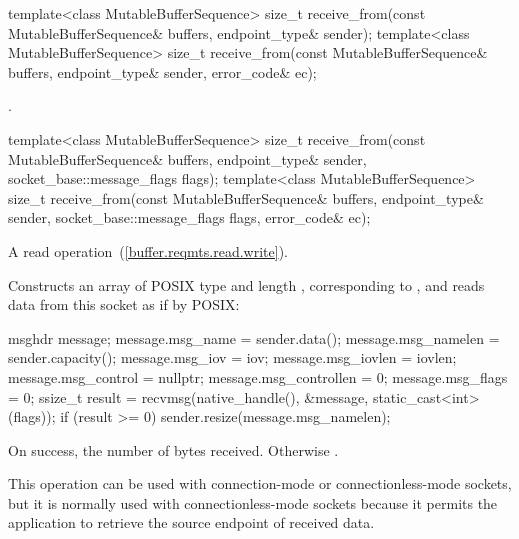 \begin{itemdecl}
template<class MutableBufferSequence>
  size_t receive_from(const MutableBufferSequence& buffers,
                      endpoint_type& sender);
template<class MutableBufferSequence>
  size_t receive_from(const MutableBufferSequence& buffers,
                      endpoint_type& sender, error_code& ec);
\end{itemdecl}

\begin{itemdescr}
\pnum
\returns {}.
\end{itemdescr}

\begin{itemdecl}
template<class MutableBufferSequence>
  size_t receive_from(const MutableBufferSequence& buffers,
                      endpoint_type& sender,
                      socket_base::message_flags flags);
template<class MutableBufferSequence>
  size_t receive_from(const MutableBufferSequence& buffers,
                      endpoint_type& sender,
                      socket_base::message_flags flags,
                      error_code& ec);
\end{itemdecl}

\begin{itemdescr}
\pnum
A read operation~(\ref{buffer.reqmts.read.write}).

\pnum
\effects Constructs an array  of POSIX type  and length , corresponding to , and reads data from this socket as if by POSIX:
\begin{codeblock}
msghdr message;
message.msg_name = sender.data();
message.msg_namelen = sender.capacity();
message.msg_iov = iov;
message.msg_iovlen = iovlen;
message.msg_control = nullptr;
message.msg_controllen = 0;
message.msg_flags = 0;
ssize_t result = recvmsg(native_handle(), &message, static_cast<int>(flags));
if (result >= 0)
  sender.resize(message.msg_namelen);
\end{codeblock}


\pnum
\returns On success, the number of bytes received. Otherwise .

\pnum
 \begin{note} This operation can be used with connection-mode or connectionless-mode sockets, but it is normally used with connectionless-mode sockets because it permits the application to retrieve the source endpoint of received data. \end{note}
\end{itemdescr}

